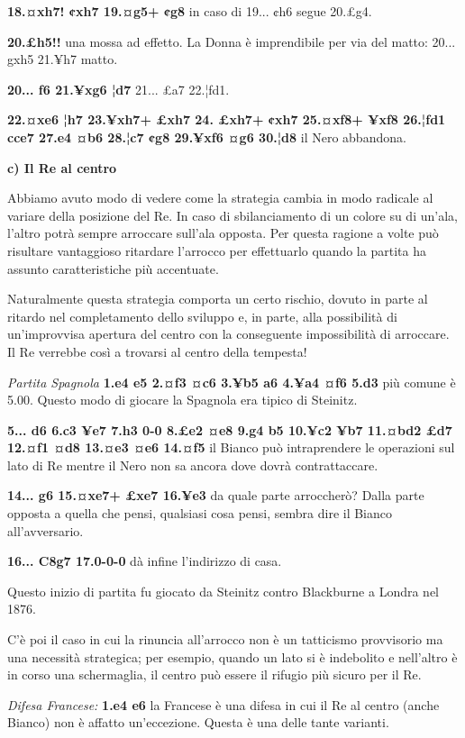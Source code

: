 \documentclass[
]{article}
\begin{document}
\textbf{18.¤xh7! ¢xh7 19.¤g5+ ¢g8} in caso di 19... ¢h6 segue 20.£g4.

\textbf{20.£h5!!} una mossa ad effetto. La Donna è imprendibile per via
del matto: 20... gxh5 21.¥h7 matto.

\textbf{20... f6 21.¥xg6 ¦d7} 21... £a7 22.¦fd1.

\textbf{22.¤xe6 ¦h7 23.¥xh7+ £xh7 24. £xh7+ ¢xh7 25.¤xf8+ ¥xf8 26.¦fd1
cce7 27.e4 ¤b6 28.¦c7 ¢g8 29.¥xf6 ¤g6 30.¦d8} il Nero abbandona.

\textbf{c) Il Re al centro}

Abbiamo avuto modo di vedere come la strategia cambia in modo radicale
al variare della posizione del Re. In caso di sbilanciamento di un
colore su di un'ala, l'altro potrà sempre arroccare sull'ala opposta.
Per questa ragione a volte può risultare vantaggioso ritardare l'arrocco
per effettuarlo quando la partita ha assunto caratteristiche più
accentuate.

Naturalmente questa strategia comporta un certo rischio, dovuto in parte
al ritardo nel completamento dello sviluppo e, in parte, alla
possibilità di un'improvvisa apertura del centro con la conseguente
impossibilità di arroccare. Il Re verrebbe così a trovarsi al centro
della tempesta!

\emph{Partita Spagnola} \textbf{1.e4 e5 2.¤f3 ¤c6 3.¥b5 a6 4.¥a4 ¤f6
5.d3} più comune è 5.00. Questo modo di giocare la Spagnola era tipico
di Steinitz.

\textbf{5... d6 6.c3 ¥e7 7.h3 0-0 8.£e2 ¤e8 9.g4 b5 10.¥c2 ¥b7 11.¤bd2
£d7 12.¤f1 ¤d8 13.¤e3 ¤e6 14.¤f5} il Bianco può intraprendere le
operazioni sul lato di Re mentre il Nero non sa ancora dove dovrà
contrattaccare.

\textbf{14... g6 15.¤xe7+ £xe7 16.¥e3} da quale parte arroccherò? Dalla
parte opposta a quella che pensi, qualsiasi cosa pensi, sembra dire il
Bianco all'avversario.

\textbf{16... C8g7 17.0-0-0} dà infine l'indirizzo di casa.

Questo inizio di partita fu giocato da Steinitz contro Blackburne a
Londra nel 1876.

C'è poi il caso in cui la rinuncia all'arrocco non è un tatticismo
provvisorio ma una necessità strategica; per esempio, quando un lato si
è indebolito e nell'altro è in corso una schermaglia, il centro può
essere il rifugio più sicuro per il Re.

\emph{Difesa Francese:} \textbf{1.e4 e6} la Francese è una difesa in cui
il Re al centro (anche Bianco) non è affatto un'eccezione. Questa è una
delle tante varianti.
\end{document}
